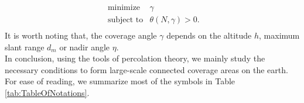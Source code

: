 \documentclass[final]{IEEEtran}
\begin{document}
\begin{equation}
    \begin{array}{ll}
       \text{ minimize}  & \gamma  \\
       \text{ subject to}  & \theta(N,\gamma)>0. \\
    \end{array}
    \label{design2}
\end{equation}
It is worth noting that, the coverage angle $\gamma$ depends on the altitude $h$, maximum slant range $d_m$ or nadir angle $\eta$.\\
\indent In conclusion, using the tools of percolation theory, we mainly study the necessary conditions to form large-scale connected coverage areas on the earth. For ease of reading, we summarize most of the symbols in Table \ref{tab:TableOfNotations}.
\end{document}
